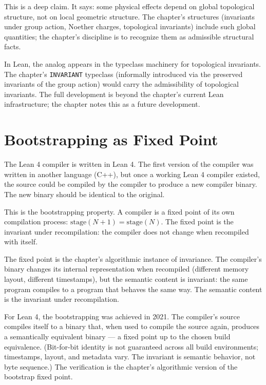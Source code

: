 This is a deep claim. It says: some physical effects depend on
global topological structure, not on local geometric structure.
The chapter's structures (invariants under group action,
Noether charges, topological invariants) include such global
quantities; the chapter's discipline is to recognize them as
admissible structural facts.

In Lean, the analog appears in the typeclass machinery for
topological invariants. The chapter's
\texttt{INVARIANT} typeclass (informally introduced via the
preserved invariants of the group action) would carry the
admissibility of topological invariants. The full development
is beyond the chapter's current Lean infrastructure; the
chapter notes this as a future development.

\section{Bootstrapping as Fixed Point}
\label{se:bootstrapping-as-fixed-point}

The Lean 4 compiler is written in Lean 4. The first version of the
compiler was written in another language (C++), but once a working
Lean 4 compiler existed, the source could be compiled by the
compiler to produce a new compiler binary. The new binary should
be identical to the original.

This is the bootstrapping property. A compiler is a fixed point of
its own compilation process: $\text{stage}(N+1) = \text{stage}(N)$.
The fixed point is the invariant under recompilation: the
compiler does not change when recompiled with itself.

The fixed point is the chapter's algorithmic instance of invariance.
The compiler's binary changes its internal representation when
recompiled (different memory layout, different timestamps), but
the semantic content is invariant: the same program compiles to a
program that behaves the same way. The semantic content is the
invariant under recompilation.

For Lean 4, the bootstrapping was achieved in 2021. The compiler's
source compiles itself to a binary that, when used to compile the
source again, produces a semantically equivalent binary --- a
fixed point up to the chosen build equivalence. (Bit-for-bit
identity is not guaranteed across all build environments;
timestamps, layout, and metadata vary. The invariant is semantic
behavior, not byte sequence.) The verification is the chapter's
algorithmic version of the bootstrap fixed point.

